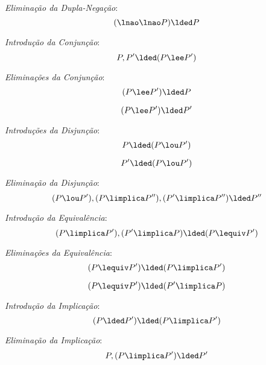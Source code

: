 \emph{Eliminação da Dupla-Negação}:
	\begin{equation*}
	(\lnao\lnao P) \lded P
	\end{equation*}

\emph{Introdução da Conjunção}:
	\begin{equation*}
	P, P' \lded (P \lee P')
	\end{equation*}

\emph{Eliminações da Conjunção}:
	\begin{equation*}
	(P \lee P') \lded P
	\end{equation*}

	\begin{equation*}
	(P \lee P') \lded P'
	\end{equation*}

\emph{Introduções da Disjunção}:
	\begin{equation*}
	P \lded (P \lou P')
	\end{equation*}

	\begin{equation*}
	P' \lded (P \lou P')
	\end{equation*}

\emph{Eliminação da Disjunção}:
	\begin{equation*}
	(P \lou P'), (P \limplica P''), (P' \limplica P'') \lded P''
	\end{equation*}

\emph{Introdução da Equivalência}:
	\begin{equation*}
	(P \limplica P'), (P' \limplica P) \lded (P \lequiv P')
	\end{equation*}

\emph{Eliminações da Equivalência}:
	\begin{equation*}
	(P \lequiv P') \lded (P \limplica P')
	\end{equation*}

	\begin{equation*}
	(P \lequiv P') \lded (P' \limplica P)
	\end{equation*}

\emph{Introdução da Implicação}:
	\begin{equation*}
	(P \lded P') \lded (P \limplica P')
	\end{equation*}

\emph{Eliminação da Implicação}:
	\begin{equation*}
	P, (P \limplica P') \lded P'
	\end{equation*}

